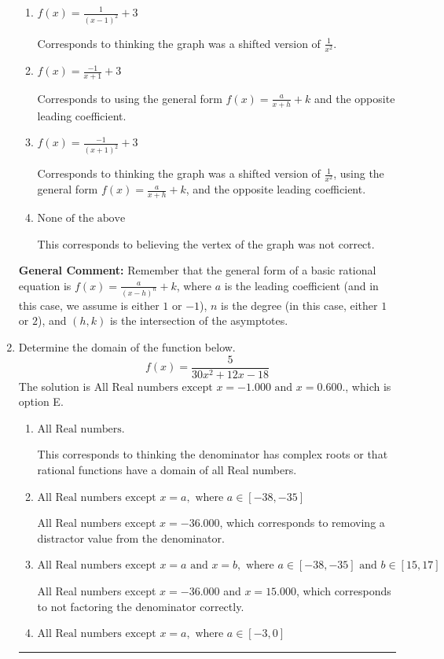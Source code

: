 \documentclass{extbook}[14pt]
\newcommand{\litem}[1]{\item #1

\rule{\textwidth}{0.4pt}}
\begin{document}
\begin{enumerate}
{\begin{enumerate}[label=\Alph*.]
This is the correct option.
\item \( f(x) = \frac{1}{(x - 1)^2} + 3 \)

Corresponds to thinking the graph was a shifted version of $\frac{1}{x^2}$.
\item \( f(x) = \frac{-1}{x + 1} + 3 \)

Corresponds to using the general form $f(x) = \frac{a}{x+h}+k$ and the opposite leading coefficient.
\item \( f(x) = \frac{-1}{(x + 1)^2} + 3 \)

Corresponds to thinking the graph was a shifted version of $\frac{1}{x^2}$, using the general form $f(x) = \frac{a}{x+h}+k$, and the opposite leading coefficient.
\item \( \text{None of the above} \)

This corresponds to believing the vertex of the graph was not correct.
\end{enumerate}

\textbf{General Comment:} Remember that the general form of a basic rational equation is $ f(x) = \frac{a}{(x-h)^n} + k$, where $a$ is the leading coefficient (and in this case, we assume is either $1$ or $-1$), $n$ is the degree (in this case, either $1$ or $2$), and $(h, k)$ is the intersection of the asymptotes.
}
\litem{
Determine the domain of the function below.
\[ f(x) = \frac{5}{30x^{2} +12 x -18} \]The solution is \( \text{All Real numbers except } x = -1.000 \text{ and } x = 0.600. \), which is option E.\begin{enumerate}[label=\Alph*.]
\item \( \text{All Real numbers.} \)

This corresponds to thinking the denominator has complex roots or that rational functions have a domain of all Real numbers.
\item \( \text{All Real numbers except } x = a, \text{ where } a \in [-38, -35] \)

All Real numbers except $x = -36.000$, which corresponds to removing a distractor value from the denominator.
\item \( \text{All Real numbers except } x = a \text{ and } x = b, \text{ where } a \in [-38, -35] \text{ and } b \in [15, 17] \)

All Real numbers except $x = -36.000$ and $x = 15.000$, which corresponds to not factoring the denominator correctly.
\item \( \text{All Real numbers except } x = a, \text{ where } a \in [-3, 0] \)


\end{enumerate}}
\end{enumerate}
\end{document}
